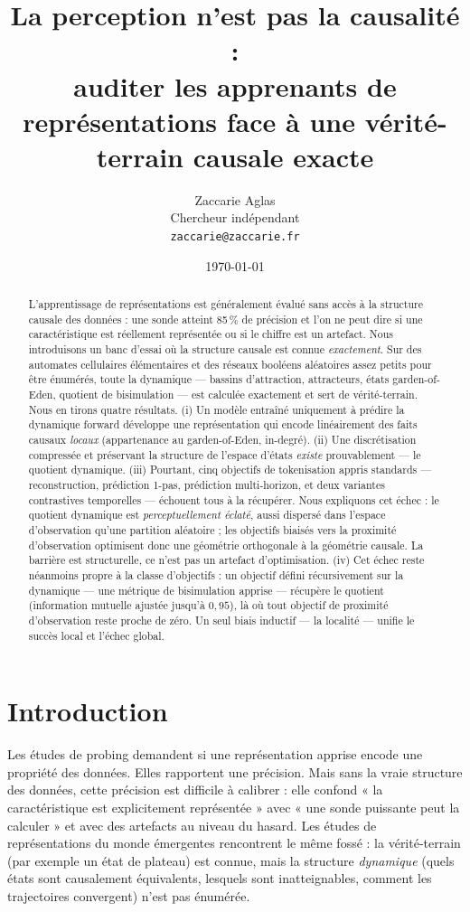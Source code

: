 \documentclass[11pt]{article}
\title{La perception n'est pas la causalité :\\
auditer les apprenants de représentations face à une vérité-terrain
causale exacte}
\author{Zaccarie Aglas\\ Chercheur indépendant\\ \texttt{zaccarie@zaccarie.fr}}
\date{\today}
\begin{document}
\maketitle

\begin{abstract}
L'apprentissage de représentations est généralement évalué sans accès à la
structure causale des données : une sonde atteint 85\,\% de précision et l'on
ne peut dire si une caractéristique est réellement représentée ou si le chiffre
est un artefact. Nous introduisons un banc d'essai où la structure causale est
connue \emph{exactement}. Sur des automates cellulaires élémentaires et des
réseaux booléens aléatoires assez petits pour être énumérés, toute la
dynamique --- bassins d'attraction, attracteurs, états garden-of-Eden, quotient
de bisimulation --- est calculée exactement et sert de vérité-terrain. Nous en
tirons quatre résultats. (i) Un modèle entraîné uniquement à prédire la
dynamique forward développe une représentation qui encode linéairement des
faits causaux \emph{locaux} (appartenance au garden-of-Eden, in-degré). (ii) Une
discrétisation compressée et préservant la structure de l'espace d'états
\emph{existe} prouvablement --- le quotient dynamique. (iii) Pourtant, cinq
objectifs de tokenisation appris standards --- reconstruction, prédiction
1-pas, prédiction multi-horizon, et deux variantes contrastives temporelles ---
échouent tous à la récupérer. Nous expliquons cet échec : le quotient dynamique
est \emph{perceptuellement éclaté}, aussi dispersé dans l'espace d'observation
qu'une partition aléatoire ; les objectifs biaisés vers la proximité
d'observation optimisent donc une géométrie orthogonale à la géométrie causale.
La barrière est structurelle, ce n'est pas un artefact d'optimisation. (iv) Cet
échec reste néanmoins propre à la classe d'objectifs : un objectif défini
récursivement sur la dynamique --- une métrique de bisimulation apprise ---
récupère le quotient (information mutuelle ajustée jusqu'à $0{,}95$), là où tout
objectif de proximité d'observation reste proche de zéro. Un seul biais inductif
--- la localité --- unifie le succès local et l'échec global.
\end{abstract}

\section{Introduction}

Les études de probing demandent si une représentation apprise encode une
propriété des données. Elles rapportent une précision. Mais sans la vraie
structure des données, cette précision est difficile à calibrer : elle confond
« la caractéristique est explicitement représentée » avec « une sonde
puissante peut la calculer » et avec des artefacts au niveau du hasard. Les
études de représentations du monde émergentes rencontrent le même fossé : la
vérité-terrain (par exemple un état de plateau) est connue, mais la structure
\emph{dynamique} (quels états sont causalement équivalents, lesquels sont
inatteignables, comment les trajectoires convergent) n'est pas énumérée.
\end{document}
